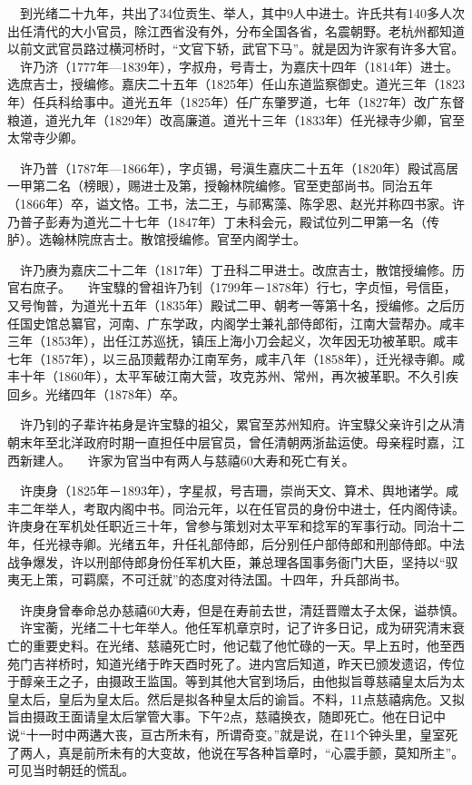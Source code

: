 $\quad$到光绪二十九年，共出了34位贡生、举人，其中9人中进士。许氏共有140多人次出任清代的大小官员，除江西省没有外，分布全国各省，名震朝野。老杭州都知道以前文武官员路过横河桥时，“文官下轿，武官下马”。就是因为许家有许多大官。
$\quad$许乃济（1777年—1839年），字叔舟，号青士，为嘉庆十四年（1814年）进士。选庶吉士，授编修。嘉庆二十五年（1825年）任山东道监察御史。道光三年（1823年）任兵科给事中。道光五年（1825年）任广东肇罗道，七年（1827年）改广东督粮道，道光九年（1829年）改高廉道。道光十三年（1833年）任光禄寺少卿，官至太常寺少卿。

$\quad$许乃普（1787年—1866年），字贞锡，号滇生嘉庆二十五年（1820年）殿试高居一甲第二名（榜眼），赐进士及第，授翰林院编修。官至吏部尚书。同治五年（1866年）卒，谥文恪。工书，法二王，与祁寯藻、陈孚恩、赵光并称四书家。许乃普子彭寿为道光二十七年（1847年）丁未科会元，殿试位列二甲第一名（传胪）。选翰林院庶吉士。散馆授编修。官至内阁学士。

$\quad$许乃赓为嘉庆二十二年（1817年）丁丑科二甲进士。改庶吉士，散馆授编修。历官右庶子。
$\quad$许宝騄的曾祖许乃钊（1799年－1878年）行七，字贞恒，号信臣，又号恂普，为道光十五年（1835年）殿试二甲、朝考一等第十名，授编修。之后历任国史馆总纂官，河南、广东学政，内阁学士兼礼部侍郎衔，江南大营帮办。咸丰三年（1853年），出任江苏巡抚，镇压上海小刀会起义，次年因无功被革职。咸丰七年（1857年），以三品顶戴帮办江南军务，咸丰八年（1858年），迁光禄寺卿。咸丰十年（1860年），太平军破江南大营，攻克苏州、常州，再次被革职。不久引疾回乡。光绪四年（1878年）卒。

$\quad$许乃钊的子辈许祐身是许宝騄的祖父，累官至苏州知府。许宝騄父亲许引之从清朝末年至北洋政府时期一直担任中层官员，曾任清朝两浙盐运使。母亲程时嘉，江西新建人。
$\quad$许家为官当中有两人与慈禧60大寿和死亡有关。

$\quad$许庚身（1825年－1893年），字星叔，号吉珊，崇尚天文、算术、舆地诸学。咸丰二年举人，考取内阁中书。同治元年，以在任官员的身份中进士，任内阁侍读。许庚身在军机处任职近三十年，曾参与策划对太平军和捻军的军事行动。同治十二年，任光禄寺卿。光绪五年，升任礼部侍郎，后分别任户部侍郎和刑部侍郎。中法战争爆发，许以刑部侍郎身份任军机大臣，兼总理各国事务衙门大臣，坚持以“驭夷无上策，可羁縻，不可迁就”的态度对待法国。十四年，升兵部尚书。

$\quad$许庚身曾奉命总办慈禧60大寿，但是在寿前去世，清廷晋赠太子太保，谥恭慎。
$\quad$许宝蘅，光绪二十七年举人。他任军机章京时，记了许多日记，成为研究清末衰亡的重要史料。在光绪、慈禧死亡时，他记载了他忙碌的一天。早上五时，他至西苑门吉祥桥时，知道光绪于昨天酉时死了。进内宫后知道，昨天已颁发遗诏，传位于醇亲王之子，由摄政王监国。等到其他大官到场后，由他拟旨尊慈禧皇太后为太皇太后，皇后为皇太后。然后是拟各种皇太后的谕旨。不料，11点慈禧病危。又拟旨由摄政王面请皇太后掌管大事。下午2点，慈禧换衣，随即死亡。他在日记中说“十一时中两遘大丧，亘古所未有，所谓奇变。”就是说，在11个钟头里，皇室死了两人，真是前所未有的大变故，他说在写各种旨章时，“心震手颤，莫知所主”。可见当时朝廷的慌乱。 

